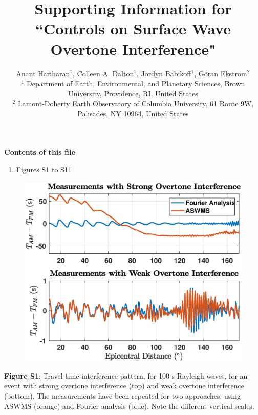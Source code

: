 \documentclass[extra,mreferee]{gji}
\title{Supporting Information for \\ ``Controls on Surface Wave Overtone Interference"}
\author[Hariharan et al.]
  {Anant Hariharan$^1$, Colleen A. Dalton$^1$,  Jordyn Babikoff$^1$, G{\"o}ran Ekstr{\"o}m$^2$ \\
  $^1$ Department of Earth, Environmental, and Planetary Sciences, Brown University, Providence, RI, United States\\
  $^2$ Lamont-Doherty Earth Observatory of Columbia University, 61 Route 9W, Palisades, NY 10964, United States}
\begin{document}
\maketitle



\noindent\textbf{Contents of this file}
\begin{enumerate}
\item Figures S1 to S11
\end{enumerate}

\newpage
\begin{figure}
 \noindent\includegraphics[width=1\textwidth]{FigS1_VSver.eps} \end{figure} \textbf{Figure S1}: Travel-time interference pattern, for 100-s Rayleigh waves, for an event with strong overtone interference (top) and weak overtone interference (bottom). The measurements have been repeated for two approaches: using ASWMS (orange) and Fourier analysis (blue). Note the different vertical scales.
\end{document}

